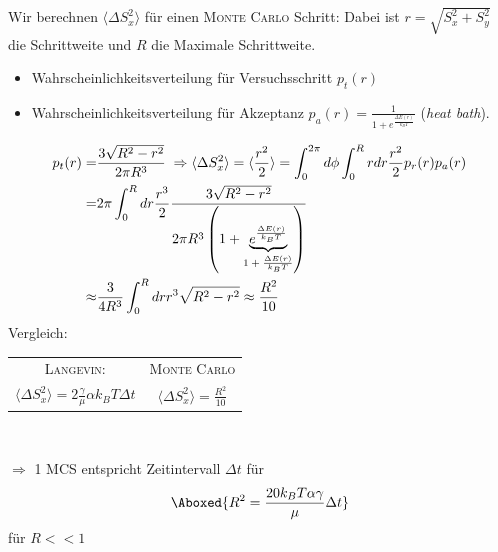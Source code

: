 \documentclass[12pt]{article}
\begin{document}
    Wir berechnen $\langle \Delta S_x^2 \rangle $ für einen \textsc{Monte Carlo} Schritt: Dabei ist $r = \sqrt{S_x^2 + S_y^2}$ die Schrittweite und $R$ die Maximale Schrittweite.
    \begin{itemize}
    \item Wahrscheinlichkeitsverteilung für Versuchsschritt $p_t (r)$
    \item Wahrscheinlichkeitsverteilung für Akzeptanz $p_a (r) = \frac{1}{1 + e^\frac{\Delta E(r)}{k_B T}}$ (\textit{heat bath}).
    \end{itemize}
    \begin{align}
p_t (r) = & \frac{3 \sqrt{ R^2 - r^2}} { 2 \pi R^3}     \; \Rightarrow \langle\Delta S_x^2 \rangle = \langle \frac{r^2}{2} \rangle = \int_0^{2 \pi} d \phi \int_0 ^R r dr \frac{r^2}{2} p_r (r) p_a (r)   \\
=& 2 \pi  \int_0^R dr \frac{r^3}{2} \frac{3 \sqrt{R^2 - r^2}}{2\pi R^3 \left( 1 + \underbrace{ e^\frac{\Delta E (r) }{k_B T}}_\text{$ 1+ \frac{\Delta E (r)}{k_B T}$} \right)} 
\\ \approx & \frac{3}{4 R^3} \int_0^R dr r^3 \sqrt{R^2 - r^2} \approx \frac{R^2}{10}
\end{align}
Vergleich:  \\
\begin{center}


\begin{tabular}{ c c }
\textsc{Langevin:} & \textsc{Monte Carlo} \\ 
$\langle \Delta S_x^2 \rangle = 2\frac{\gamma}{\mu} \alpha k_B T \Delta t $ & $ \langle \Delta S_x^2 \rangle = \frac{R^2}{10} $\\ 
\end{tabular} \\
\end{center}

$\Rightarrow $ 1 MCS entspricht Zeitintervall $\Delta t$ für
\begin{align}
\Aboxed{ R^2 = \frac{20 k_B T \alpha \gamma}{\mu} \Delta t }
\end{align}
für $R<<1$

 
\end{document}
